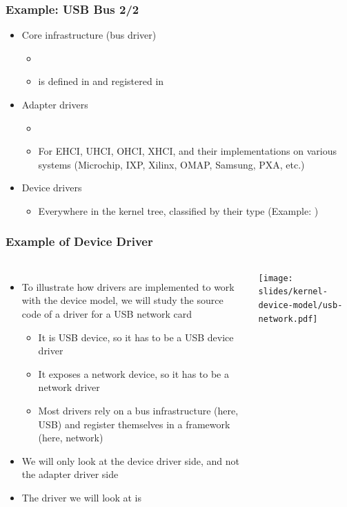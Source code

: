 \begin{frame}
  \frametitle{Example: USB Bus 2/2}
  \begin{itemize}
  \item Core infrastructure (bus driver)
    \begin{itemize}
    \item {}
    \item {} is defined in
       and registered in
    \end{itemize}
  \item Adapter drivers
    \begin{itemize}
    \item {}
    \item For EHCI, UHCI, OHCI, XHCI, and their implementations on
      various systems (Microchip, IXP, Xilinx, OMAP, Samsung, PXA, etc.)
    \end{itemize}
  \item Device drivers
    \begin{itemize}
    \item Everywhere in the kernel tree, classified by their type
    (Example: )
    \end{itemize}
  \end{itemize}
\end{frame}

\begin{frame}
  \frametitle{Example of Device Driver}
  \begin{columns}
  \begin{itemize}
  \item To illustrate how drivers are implemented to work with the
    device model, we will study the source code of a driver for a USB
    network card
    \begin{itemize}
    \item It is USB device, so it has to be a USB device driver
    \item It exposes a network device, so it has to be a network driver
    \item Most drivers rely on a bus infrastructure (here, USB) and
      register themselves in a framework (here, network)
    \end{itemize}
  \item We will only look at the device driver side, and not the
    adapter driver side
  \item The driver we will look at is 
  \end{itemize}
      \texttt{[image: slides/kernel-device-model/usb-network.pdf]}
  \end{columns}
\end{frame}

